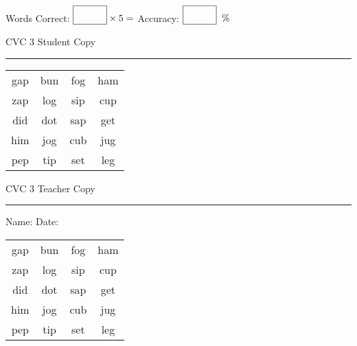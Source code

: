 \documentclass{memoir}
\begin{document}
\normalsize

Words Correct: $\fbox{\phantom{\huge 100}} \times 5 = $ Accuracy: $\fbox{\phantom{\huge 100}}\;\; \%$ 

\vfill

\newpage


\footnotesize \noindent
CVC 3 \hfill Student Copy
\smallskip
\hrule

\huge

\setlength{\tabcolsep}{14pt}
\def\arraystretch{2}

{\selectfont


\begin{vplace}[0.5]
\begin{center}
\begin{tabular}{cccc}
gap & bun & fog & ham \\
zap & log & sip & cup \\
did & dot & sap & get \\
him & jog & cub & jug \\
pep & tip & set & leg \\
\end{tabular}
\end{center}
\end{vplace}

}

\newpage

\footnotesize \noindent
CVC 3 \hfill Teacher Copy
\smallskip
\hrule

\normalsize

\vfill

\noindent
Name: \underline{\hspace{1.75in}} \hfill Date: \underline{\hspace{1in}}

\huge

{\selectfont


\begin{vplace}[0.5]
\begin{center}
\begin{tabular}{cccc}
gap & bun & fog & ham \\
zap & log & sip & cup \\
did & dot & sap & get \\
him & jog & cub & jug \\
pep & tip & set & leg \\
\end{tabular}
\end{center}
\end{vplace}



}
\end{document}
